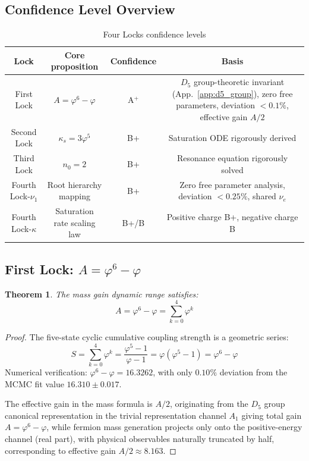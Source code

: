 \documentclass[12pt,a4paper,twocolumn]{article}
\renewcommand{\phi}{\varphi}
\newtheorem{theorem}{Theorem}[section]
\begin{document}
\subsection{Confidence Level Overview}
\begin{table}[H]
\centering
\footnotesize
\caption{Four Locks confidence levels}
\begin{tabular}{c|c|c|c}
\hline
\textbf{Lock} & \textbf{Core proposition} & \textbf{Confidence} & \textbf{Basis} \\
\hline
First Lock & $A=\phi^6-\phi$ & A$^+$ & $D_5$ group-theoretic invariant (App.~\ref{app:d5_group}), zero free parameters, deviation $<0.1\%$, effective gain $A/2$ \\
Second Lock & $\kappa_s=3\phi^5$ & B+ & Saturation ODE rigorously derived \\
Third Lock & $n_0=2$ & B+ & Resonance equation rigorously solved \\
Fourth Lock-$\nu_1$ & Root hierarchy mapping & B+ & Zero free parameter analysis, deviation $<0.25\%$, shared $\nu_e$ \\
Fourth Lock-$\kappa$ & Saturation rate scaling law & B+/B & Positive charge B+, negative charge B \\
\hline
\end{tabular}
\end{table}

\subsection{First Lock: $A=\phi^6-\phi$}
\begin{theorem}
The mass gain dynamic range satisfies:
\[
A = \phi^6 - \phi = \sum_{k=0}^4 \phi^k
\]
\end{theorem}

\begin{proof}
The five-state cyclic cumulative coupling strength is a geometric series:
\[
S = \sum_{k=0}^4 \phi^k = \frac{\phi^5-1}{\phi-1} = \phi(\phi^5-1) = \phi^6-\phi
\]
Numerical verification: $\phi^6-\phi = 16.3262$, with only $0.10\%$ deviation from the MCMC fit value $16.310\pm0.017$.

The effective gain in the mass formula is $A/2$, originating from the $D_5$ group canonical representation in the trivial representation channel $A_1$ giving total gain $A=\phi^6-\phi$, while fermion mass generation projects only onto the positive-energy channel (real part), with physical observables naturally truncated by half, corresponding to effective gain $A/2\approx 8.163$.
\end{proof}
\end{document}
